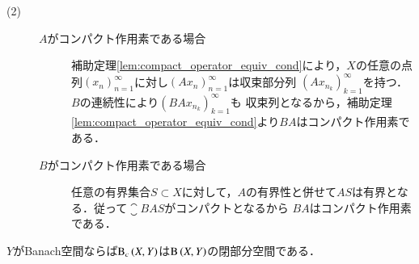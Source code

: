\begin{prf}
\begin{description}
			\item[(2)]
				\begin{description}
					\item[$A$がコンパクト作用素である場合]
						補助定理\ref{lem:compact_operator_equiv_cond}により，$X$の任意の点列$(x_n)_{n=1}^{\infty}$に対し$(Ax_n)_{n=1}^{\infty}$は収束部分列
						$\left(Ax_{n_k}\right)_{k=1}^{\infty}$を持つ．$B$の連続性により$\left(BAx_{n_k}\right)_{k=1}^{\infty}$も
						収束列となるから，補助定理\ref{lem:compact_operator_equiv_cond}より$BA$はコンパクト作用素である．
					
					\item[$B$がコンパクト作用素である場合]
						任意の有界集合$S \subset X$に対して，$A$の有界性と併せて$AS$は有界となる．従って$\closure{BAS}$がコンパクトとなるから
						$BA$はコンパクト作用素である．
				\end{description}
		\end{description}
		\QED
	\end{prf}
	
	
	\begin{screen}
		\begin{prp}
			$Y$がBanach空間ならば$\mathrm{B}_c\left(X,Y\right) $は$\mathrm{B}\left(X,Y\right) $の閉部分空間である．
		\end{prp}
	\end{screen}
	
